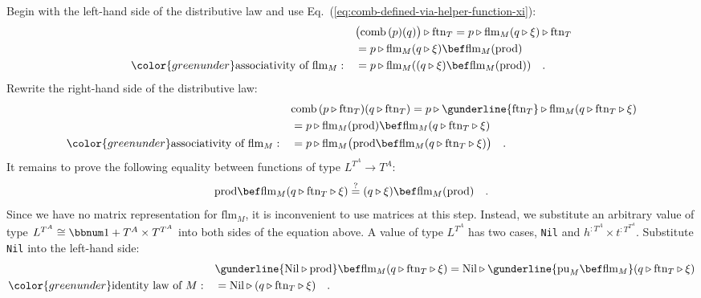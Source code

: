 Begin with the left-hand side of the distributive law and use Eq.~(\ref{eq:comb-defined-via-helper-function-xi}):
\begin{align*}
 & \big(\text{comb}\,(p)(q)\big)\triangleright\text{ftn}_{T}=p\triangleright\text{flm}_{M}(q\triangleright\xi)\triangleright\text{ftn}_{T}\\
 & =p\triangleright\text{flm}_{M}(q\triangleright\xi)\bef\text{flm}_{M}(\text{prod})\\
{\color{greenunder}\text{associativity of }\text{flm}_{M}:}\quad & =p\triangleright\text{flm}_{M}((q\triangleright\xi)\bef\text{flm}_{M}(\text{prod}))\quad.
\end{align*}
Rewrite the right-hand side of the distributive law:
\begin{align*}
 & \text{comb}\,(p\triangleright\text{ftn}_{T})(q\triangleright\text{ftn}_{T})=p\triangleright\gunderline{\text{ftn}_{T}}\triangleright\text{flm}_{M}(q\triangleright\text{ftn}_{T}\triangleright\xi)\\
 & =p\triangleright\text{flm}_{M}(\text{prod})\bef\text{flm}_{M}(q\triangleright\text{ftn}_{T}\triangleright\xi)\\
{\color{greenunder}\text{associativity of }\text{flm}_{M}:}\quad & =p\triangleright\text{flm}_{M}\big(\text{prod}\bef\text{flm}_{M}(q\triangleright\text{ftn}_{T}\triangleright\xi)\big)\quad.
\end{align*}
It remains to prove the following equality between functions of type
$L^{T^{A}}\rightarrow T^{A}$:
\[
\text{prod}\bef\text{flm}_{M}(q\triangleright\text{ftn}_{T}\triangleright\xi)\overset{?}{=}(q\triangleright\xi)\bef\text{flm}_{M}(\text{prod})\quad.
\]
Since we have no matrix representation for $\text{flm}_{M}$, it is
inconvenient to use matrices at this step. Instead, we substitute
an arbitrary value of type $L^{T^{A}}\cong\bbnum 1+T^{A}\times T^{T^{A}}$
into both sides of the equation above. A value of type $L^{T^{A}}$
has two cases, \lstinline!Nil! and $h^{:T^{A}}\times t^{:T^{T^{A}}}$.
Substitute \lstinline!Nil! into the left-hand side:
\begin{align*}
 & \gunderline{\text{Nil}\triangleright\text{prod}}\bef\text{flm}_{M}(q\triangleright\text{ftn}_{T}\triangleright\xi)=\text{Nil}\triangleright\gunderline{\text{pu}_{M}\bef\text{flm}_{M}}(q\triangleright\text{ftn}_{T}\triangleright\xi)\\
{\color{greenunder}\text{identity law of }M:}\quad & =\text{Nil}\triangleright(q\triangleright\text{ftn}_{T}\triangleright\xi)\quad.
\end{align*}
